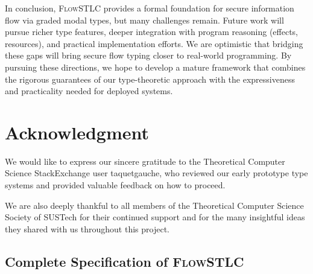 \documentclass[conference]{IEEEtran}
\begin{document}
In conclusion, \textsc{FlowSTLC} provides a formal foundation for secure information flow via graded modal types, but many challenges remain. Future work will pursue richer type features, deeper integration with program reasoning (effects, resources), and practical implementation efforts. We are optimistic that bridging these gaps will bring secure flow typing closer to real-world programming. By pursuing these directions, we hope to develop a mature framework that combines the rigorous guarantees of our type-theoretic approach with the expressiveness and practicality needed for deployed systems.

\section*{Acknowledgment}
We would like to express our sincere gratitude to the Theoretical Computer Science StackExchange user taquetgauche, who reviewed our early prototype type systems and provided valuable feedback on how to proceed.

We are also deeply thankful to all members of the Theoretical Computer Science Society of SUSTech for their continued support and for the many insightful ideas they shared with us throughout this project.




\newpage
\appendix

\subsection{Complete Specification of \textsc{FlowSTLC}}
\end{document}

